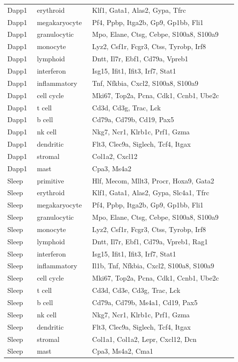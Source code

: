 \begin{longtable}{@{}>{\raggedright\arraybackslash}p{0.12\linewidth}>{\raggedright\arraybackslash}p{0.22\linewidth}>{\raggedright\arraybackslash}p{0.59\linewidth}@{}}
Dapp1 & erythroid & Klf1, Gata1, Alas2, Gypa, Tfrc \\
Dapp1 & megakaryocyte & Pf4, Ppbp, Itga2b, Gp9, Gp1bb, Fli1 \\
Dapp1 & granulocytic & Mpo, Elane, Ctsg, Cebpe, S100a8, S100a9 \\
Dapp1 & monocyte & Lyz2, Csf1r, Fcgr3, Ctss, Tyrobp, Irf8 \\
Dapp1 & lymphoid & Dntt, Il7r, Ebf1, Cd79a, Vpreb1 \\
Dapp1 & interferon & Isg15, Ifit1, Ifit3, Irf7, Stat1 \\
Dapp1 & inflammatory & Tnf, Nfkbia, Cxcl2, S100a8, S100a9 \\
Dapp1 & cell cycle & Mki67, Top2a, Pcna, Cdk1, Ccnb1, Ube2c \\
Dapp1 & t cell & Cd3d, Cd3g, Trac, Lck \\
Dapp1 & b cell & Cd79a, Cd79b, Cd19, Pax5 \\
Dapp1 & nk cell & Nkg7, Ncr1, Klrb1c, Prf1, Gzma \\
Dapp1 & dendritic & Flt3, Clec9a, Siglech, Tcf4, Itgax \\
Dapp1 & stromal & Col1a2, Cxcl12 \\
Dapp1 & mast & Cpa3, Ms4a2 \\
Sleep & primitive & Hlf, Mecom, Mllt3, Procr, Hoxa9, Gata2 \\
Sleep & erythroid & Klf1, Gata1, Alas2, Gypa, Slc4a1, Tfrc \\
Sleep & megakaryocyte & Pf4, Ppbp, Itga2b, Gp9, Gp1bb, Fli1 \\
Sleep & granulocytic & Mpo, Elane, Ctsg, Cebpe, S100a8, S100a9 \\
Sleep & monocyte & Lyz2, Csf1r, Fcgr3, Ctss, Tyrobp, Irf8 \\
Sleep & lymphoid & Dntt, Il7r, Ebf1, Cd79a, Vpreb1, Rag1 \\
Sleep & interferon & Isg15, Ifit1, Ifit3, Irf7, Stat1 \\
Sleep & inflammatory & Il1b, Tnf, Nfkbia, Cxcl2, S100a8, S100a9 \\
Sleep & cell cycle & Mki67, Top2a, Pcna, Cdk1, Ccnb1, Ube2c \\
Sleep & t cell & Cd3d, Cd3e, Cd3g, Trac, Lck \\
Sleep & b cell & Cd79a, Cd79b, Ms4a1, Cd19, Pax5 \\
Sleep & nk cell & Nkg7, Ncr1, Klrb1c, Prf1, Gzma \\
Sleep & dendritic & Flt3, Clec9a, Siglech, Tcf4, Itgax \\
Sleep & stromal & Col1a1, Col1a2, Lepr, Cxcl12, Dcn \\
Sleep & mast & Cpa3, Ms4a2, Cma1 \\
\end{longtable}
\endgroup
